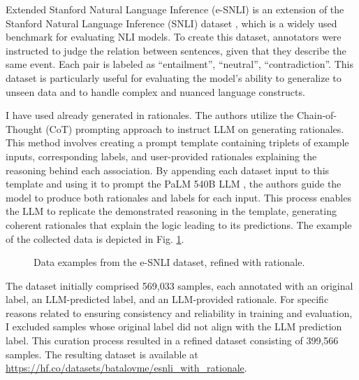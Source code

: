Extended Stanford Natural Language Inference (e-SNLI) \cite{esnli} is an extension of the Stanford Natural Language Inference (SNLI) dataset \cite{snli}, which is a widely used benchmark for evaluating NLI models. To create this dataset, annotators were instructed to judge the relation between sentences, given that they describe the same event. Each pair is labeled as ``entailment'', ``neutral'', ``contradiction''. This dataset is particularly useful for evaluating the model's ability to generalize to unseen data and to handle complex and nuanced language constructs.

I have used already generated in \cite{stepbystep} rationales. The authors utilize the Chain-of-Thought (CoT) \cite{cot} prompting approach to instruct LLM on generating rationales. This method involves creating a prompt template containing triplets of example inputs, corresponding labels, and user-provided rationales explaining the reasoning behind each association. By appending each dataset input to this template and using it to prompt the PaLM 540B LLM \cite{palm}, the authors guide the model to produce both rationales and labels for each input. This process enables the LLM to replicate the demonstrated reasoning in the template, generating coherent rationales that explain the logic leading to its predictions. The example of the collected data is depicted in Fig. \ref{fig:rationale_dataset}.

\begin{figure}[hbt]
    \centering
    \begin{subfigure}[t]{.5\linewidth}
        \centering
        
    \end{subfigure}%
    \begin{subfigure}[t]{.5\linewidth}
        \centering
        
    \end{subfigure}

    \caption{Data examples from the e-SNLI dataset, refined with rationale.}
    \label{fig:rationale_dataset}
\end{figure}

The dataset initially comprised 569,033 samples, each annotated with an original label, an LLM-predicted label, and an LLM-provided rationale. For specific reasons related to ensuring consistency and reliability in training and evaluation, I excluded samples whose original label did not align with the LLM prediction label. This curation process resulted in a refined dataset consisting of 399,566 samples. The resulting dataset is available at \linebreak \url{https://hf.co/datasets/batalovme/esnli_with_rationale}.

